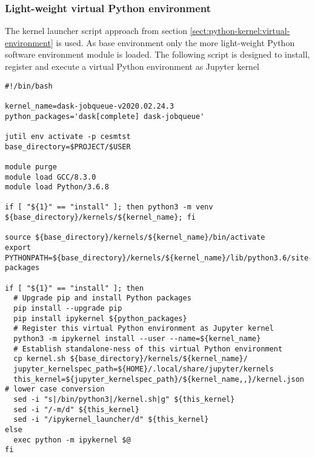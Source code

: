 \documentclass[11pt,a4paper]{article}
\begin{document}
\subsubsection{Light-weight virtual Python environment}
\label{sect:suggested-python-virtual-environment}

The kernel launcher script approach from section \ref{sect:python-kernel:virtual-environment} is used.
As base environment only the more light-weight Python software environment module is loaded.
The following script is designed to install, register and execute a virtual Python environment as Jupyter kernel

\begin{verbatim}
#!/bin/bash

kernel_name=dask-jobqueue-v2020.02.24.3
python_packages='dask[complete] dask-jobqueue'

jutil env activate -p cesmtst
base_directory=$PROJECT/$USER

module purge
module load GCC/8.3.0
module load Python/3.6.8

if [ "${1}" == "install" ]; then python3 -m venv ${base_directory}/kernels/${kernel_name}; fi

source ${base_directory}/kernels/${kernel_name}/bin/activate
export PYTHONPATH=${base_directory}/kernels/${kernel_name}/lib/python3.6/site-packages

if [ "${1}" == "install" ]; then
  # Upgrade pip and install Python packages
  pip install --upgrade pip
  pip install ipykernel ${python_packages}
  # Register this virtual Python environment as Jupyter kernel
  python3 -m ipykernel install --user --name=${kernel_name}
  # Establish standalone-ness of this virtual Python environment
  cp kernel.sh ${base_directory}/kernels/${kernel_name}/
  jupyter_kernelspec_path=${HOME}/.local/share/jupyter/kernels
  this_kernel=${jupyter_kernelspec_path}/${kernel_name,,}/kernel.json # lower case conversion
  sed -i "s|/bin/python3|/kernel.sh|g" ${this_kernel}
  sed -i "/-m/d" ${this_kernel}
  sed -i "/ipykernel_launcher/d" ${this_kernel}
else
  exec python -m ipykernel $@
fi

\end{verbatim}


\end{document}
